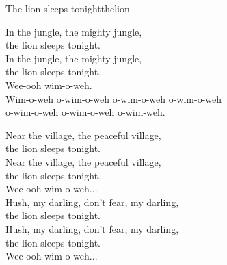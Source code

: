 \begin{song}{The lion sleeps tonight}{thelion}
\begin{vers}
In the jungle, the mighty jungle, \\
the lion sleeps tonight.\\
In the jungle, the mighty jungle, \\
the lion sleeps tonight.\\
Wee-ooh wim-o-weh.\\
\repopen Wim-o-weh o-wim-o-weh o-wim-o-weh o-wim-o-weh\\
o-wim-o-weh o-wim-o-weh o-wim-weh. \repclose\\
\end{vers}
\begin{vers}
Near the village, the peaceful village, \\
the lion sleeps tonight.\\
Near the village, the peaceful village, \\
the lion sleeps tonight.\\
Wee-ooh wim-o-weh...\\
Hush, my darling, don't fear, my darling, \\
the lion sleeps tonight.\\
Hush, my darling, don't fear, my darling, \\
the lion sleeps tonight.\\
Wee-ooh wim-o-weh...\\
\end{vers}
\end{song}

